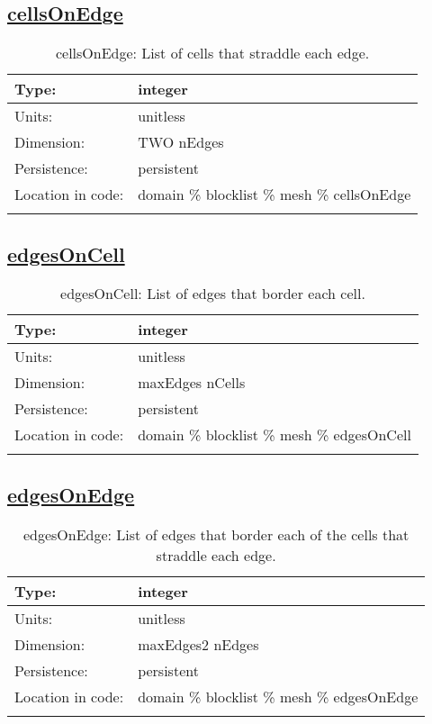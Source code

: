 \subsection[cellsOnEdge]{\hyperref[sec:var_tab_mesh]{cellsOnEdge}}
\label{subsec:var_sec_mesh_cellsOnEdge}
\begin{center}
\begin{longtable}{| p{2.0in} | p{4.0in} |}
        \hline 
        Type: & integer \\
        \hline 
        Units: & \si{unitless} \\
        \hline 
        Dimension: & TWO nEdges \\
        \hline 
        Persistence: & persistent \\
        \hline 
         Location in code: & domain \% blocklist \% mesh \% cellsOnEdge \\
         \hline 
    \caption{cellsOnEdge: List of cells that straddle each edge.}
\end{longtable}
\end{center}
\subsection[edgesOnCell]{\hyperref[sec:var_tab_mesh]{edgesOnCell}}
\label{subsec:var_sec_mesh_edgesOnCell}
\begin{center}
\begin{longtable}{| p{2.0in} | p{4.0in} |}
        \hline 
        Type: & integer \\
        \hline 
        Units: & \si{unitless} \\
        \hline 
        Dimension: & maxEdges nCells \\
        \hline 
        Persistence: & persistent \\
        \hline 
         Location in code: & domain \% blocklist \% mesh \% edgesOnCell \\
         \hline 
    \caption{edgesOnCell: List of edges that border each cell.}
\end{longtable}
\end{center}
\subsection[edgesOnEdge]{\hyperref[sec:var_tab_mesh]{edgesOnEdge}}
\label{subsec:var_sec_mesh_edgesOnEdge}
\begin{center}
\begin{longtable}{| p{2.0in} | p{4.0in} |}
        \hline 
        Type: & integer \\
        \hline 
        Units: & \si{unitless} \\
        \hline 
        Dimension: & maxEdges2 nEdges \\
        \hline 
        Persistence: & persistent \\
        \hline 
         Location in code: & domain \% blocklist \% mesh \% edgesOnEdge \\
         \hline 
    \caption{edgesOnEdge: List of edges that border each of the cells that straddle each edge.}
\end{longtable}
\end{center}
